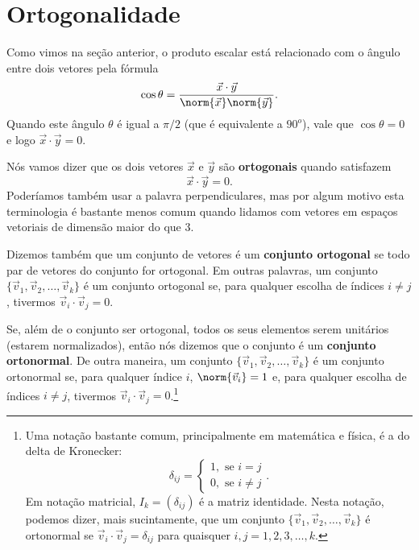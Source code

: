 \section{Ortogonalidade}

Como vimos na seção anterior, o produto escalar está relacionado com o ângulo entre dois vetores pela fórmula
\begin{equation}
\cos \theta = \frac{\vec{x} \cdot \vec{y}}{\norm{\vec{x}} \norm{\vec{y}}}.
\end{equation} Quando este ângulo $\theta$ é igual a $\pi /2$ (que é equivalente a $90^o$), vale que $\cos \theta = 0$ e logo $\vec{x} \cdot \vec{y} = 0$.

Nós vamos dizer que os dois vetores $\vec{x}$ e $\vec{y}$ são \textbf{ortogonais} quando satisfazem
\begin{equation}
\vec{x} \cdot \vec{y} = 0.
\end{equation} Poderíamos também usar a palavra perpendiculares, mas por algum motivo esta terminologia é bastante menos comum quando lidamos com vetores em espaços vetoriais de dimensão maior do que $3$.

Dizemos também que um conjunto de vetores é um \textbf{conjunto ortogonal} se todo par de vetores do conjunto for ortogonal. Em outras palavras, um conjunto $\{\vec{v}_1, \vec{v}_2, \dots, \vec{v}_k\}$ é um conjunto ortogonal se, para qualquer escolha de índices $i \neq j$, tivermos $\vec{v}_i \cdot \vec{v}_j = 0$.

Se, além de o conjunto ser ortogonal, todos os seus elementos serem unitários (estarem normalizados), então nós dizemos que o conjunto é um \textbf{conjunto ortonormal}. De outra maneira, um conjunto $\{\vec{v}_1, \vec{v}_2, \dots, \vec{v}_k\}$ é um conjunto ortonormal se, para qualquer índice $i$, $\norm{\vec{v}_i} = 1$ e, para qualquer escolha de índices $i \neq j$, tivermos $\vec{v}_i \cdot \vec{v}_j = 0$.\footnote{Uma notação bastante comum, principalmente em matemática e física, é a do delta de Kronecker:\begin{equation} \delta_{ij} = \left\lbrace \begin{array}{l}
	1, \text{ se } i = j \\
	0, \text{ se } i \neq j
	\end{array} \right. . \end{equation} Em notação matricial, $I_k = (\delta_{ij})$ é a matriz identidade. Nesta notação, podemos dizer, mais sucintamente, que um conjunto $\{\vec{v}_1, \vec{v}_2, \dots, \vec{v}_k\}$ é ortonormal se $\vec{v}_i \cdot \vec{v}_j = \delta_{ij}$ para quaisquer $i,j = 1, 2, 3, \dots, k$.}

